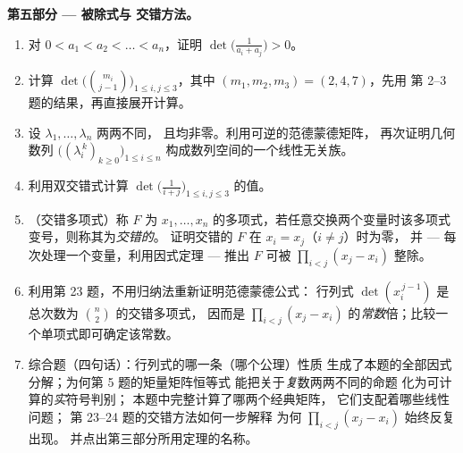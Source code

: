 \begin{problem}
\medskip
\noindent\textbf{第五部分 --- 被除式与
交错方法。}
\begin{enumerate}[resume]
  \item 对 $0 < a_1 < a_2 < \dots < a_n$，证明
        $\det\bigl(\frac{1}{a_i + a_j}\bigr) > 0$。
  \item 计算 $\det\bigl(\binom{m_i}{j-1}\bigr)_{1 \leq i, j
        \leq 3}$，其中 $(m_1, m_2, m_3) = (2, 4, 7)$，先用
        第 2--3 题的结果，再直接展开计算。
  \item 设 $\lambda_1, \dots, \lambda_n$ 两两不同，
        且均非零。利用可逆的范德蒙德矩阵，
        再次证明几何数列
        $\bigl((\lambda_i^{\,k})_{k \geq 0}\bigr)_{1 \leq i \leq
        n}$ 构成数列空间的一个线性无关族。
  \item 利用双交错式计算 $\det\bigl(\frac{1}{i + j}\bigr)_{1 \leq i, j
        \leq 3}$ 的值。
  \item （交错多项式）称 $F$ 为 $x_1,
        \dots, x_n$ 的多项式，若任意交换两个变量时该多项式变号，则称其为\emph{交错的}。
        证明交错的 $F$
        在 $x_i = x_j$（$i \neq j$）时为零，
        并 --- 每次处理一个变量，利用因式定理 --- 推出 $F$
        可被 $\prod_{i<j}(x_j - x_i)$ 整除。
  \item 利用第 23 题，不用归纳法重新证明范德蒙德公式：
        行列式 $\det(x_i^{\,j-1})$ 是
        总次数为 $\binom n2$ 的交错多项式，
        因而是 $\prod_{i<j}(x_j -
        x_i)$ 的\emph{常数}倍；比较一个单项式即可确定该常数。
  \item 综合题（四句话）：行列式的哪一条（哪个公理）性质
        生成了本题的全部因式分解；为何第 5 题的矩量矩阵恒等式
        能把关于\emph{复}数两两不同的命题
        化为可计算的\emph{实}符号判别；
        本题中完整计算了哪两个经典矩阵，
        它们支配着哪些线性问题；
        第 23--24 题的交错方法如何一步解释
        为何 $\prod_{i<j}(x_j -
        x_i)$ 始终反复出现。
        并点出第三部分所用定理的名称。
\end{enumerate}
\end{problem}
